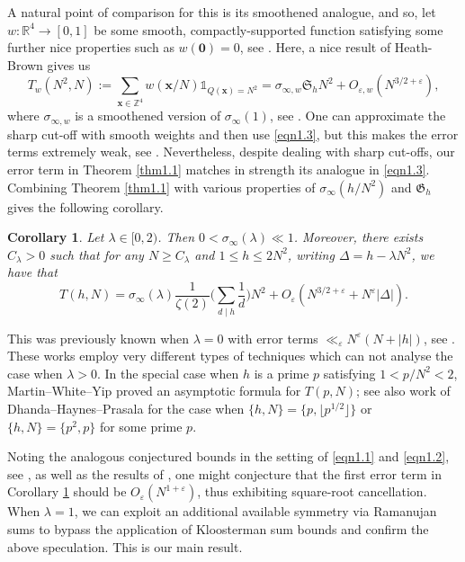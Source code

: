 \documentclass[12pt,reqno]{amsart}
\newtheorem{corollary}[theorem]{Corollary}
\theoremstyle{definition}
\theoremstyle{remark}
\numberwithin{equation}{section}
\renewcommand{\geq}{\geqslant}
\renewcommand{\leq}{\leqslant}
\def\eps{\varepsilon}
\newcommand\1{\mathds{1}}
\renewcommand\vec{\bm}
\begin{document}
A natural point of comparison for this is its smoothened analogue, and so, let $w : \mathbb{R}^4 \to [0,1]$ be some smooth, compactly-supported function satisfying some further nice properties such as $w(\vec{0}) = 0$, see \cite{HB1996}. Here, a nice result of Heath-Brown \cite[Theorem 4]{HB1996} gives us
\begin{equation} \label{eqn1.3}
T_{w}(N^2,N) := \sum_{\vec{x} \in \mathbb{Z}^4} w(\vec{x}/N) \1_{Q(\vec{x}) = N^2} = \sigma_{\infty,w} \mathfrak{S}_h N^2 + O_{\eps, w}(N^{3/2 + \eps}), 
\end{equation}
where $\sigma_{\infty,w}$ is a smoothened version of $\sigma_{\infty}(1)$, see \cite[Theorem 3]{HB1996}. 
One can approximate the sharp cut-off with smooth weights and then use \eqref{eqn1.3}, but this makes the error terms extremely weak, see \cite[Theorem 3.6]{Nie2010}. Nevertheless, despite dealing with sharp cut-offs, our error term in Theorem \ref{thm1.1} matches in strength its analogue in \eqref{eqn1.3}. Combining Theorem \ref{thm1.1} with various properties of $\sigma_{\infty}(h/N^2)$ and $\mathfrak{G}_h$ gives the following corollary.

\begin{corollary} \label{cor1.2}
    Let $\lambda \in [0, 2)$. Then $0 < \sigma_{\infty}(\lambda) \ll 1$. Moreover, there exists  $C_{\lambda} >0$ such that for any $N \geq C_{\lambda}$ and $1 \leq h \leq 2N^2$, writing $\Delta = h - \lambda N^2$, we have that
    \[ T(h,N) = \sigma_{\infty}(\lambda) \frac{1}{\zeta(2)} \bigg(\sum_{d\mid h}\frac{1}{d}\bigg) N^2 + O_{\eps}(N^{3/2+ \eps}+ N^{\eps}|\Delta|). \]
\end{corollary}

This was previously known when $\lambda = 0$ with error terms $\ll_{\eps} N^{\eps}(N+ |h|)$, see \cite{CM2025b, DHP2025}. These works employ very different types of techniques which can not analyse the case when $\lambda >0$. In the special case when $h$ is a prime $p$ satisfying $1< p/N^2 < 2$, Martin--White--Yip \cite{martin} proved an asymptotic formula for $T(p,N)$; see also work of Dhanda--Haynes--Prasala \cite[Theorem 2]{DHP2025} for the case when $\{h,N\} = \{p, \lfloor p^{1/2} \rfloor\}$ or $\{h,N\} = \{p^2,p\}$ for some prime $p$.


Noting the analogous conjectured bounds in the setting of \eqref{eqn1.1} and \eqref{eqn1.2}, see \cite[\S1]{CM2025b}, as well as the results of \cite{CM2025b, DHP2025}, one might conjecture that the first error term in Corollary \ref{cor1.2} should be $O_{\eps}(N^{1 + \eps})$, thus exhibiting square-root cancellation. When $\lambda =1$, we can exploit an additional available symmetry via Ramanujan sums to bypass the application of Kloosterman sum bounds and confirm the above speculation. This is our main result.
\end{document}
